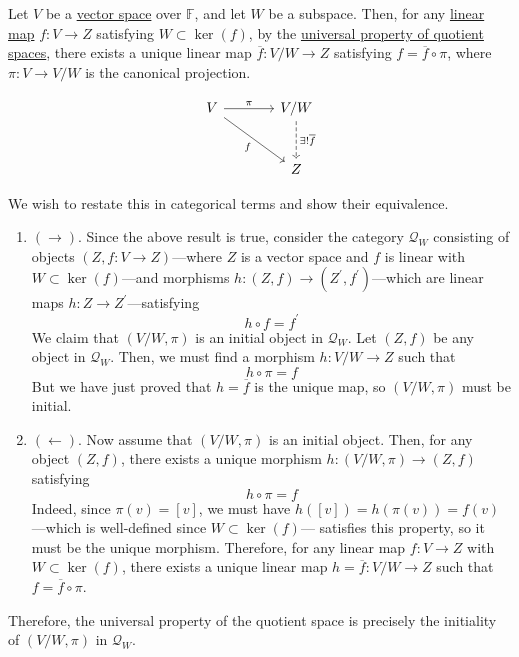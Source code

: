   \begin{example}
    \label{ex:quotient-vector-spaces-as-initial-universal}
		Let $V$ be a \hyperref[lin-def:vector-space]{vector space} over $\mathbb{F}$, and let $W$ be a subspace. Then, for any \hyperref[lin-def:linear_map]{linear map} $f: V \to Z$ satisfying $W \subset \ker(f)$, by the \hyperref[lin-thm:universal_quotient]{universal property of quotient spaces}, there exists a unique linear map $\overline{f}: V/W \to Z$ satisfying $f = \overline{f} \circ \pi$, where $\pi: V \to V/W$ is the canonical projection. 

    \begin{equation}
      \begin{tikzcd}[column sep=large, row sep=large]
        V \arrow[r, "\pi"] \arrow[dr, "f"'] &
        V/W \arrow[d, dashed, "\exists!\overline f"] \\
        & Z
      \end{tikzcd}
    \end{equation}

		We wish to restate this in categorical terms and show their equivalence. 
		\begin{enumerate}
			\item $(\rightarrow)$. Since the above result is true, consider the category $\mathcal{Q}_W$ consisting of objects $(Z, f: V \to Z)$---where $Z$ is a vector space and $f$ is linear with $W \subset \ker(f)$---and morphisms $h: (Z, f) \to (Z^\prime, f^\prime)$---which are linear maps $h: Z \to Z^\prime$---satisfying 
				\begin{equation}
				  h \circ f = f^\prime
				\end{equation}
				We claim that $(V/W, \pi)$ is an initial object in $\mathcal{Q}_W$. Let $(Z, f)$ be any object in $\mathcal{Q}_W$. Then, we must find a morphism $h: V/W \to Z$ such that 
				\begin{equation}
				  h \circ \pi = f 
				\end{equation}
				But we have just proved that $h = \overline{f}$ is the unique map, so $(V/W, \pi)$ must be initial. 

			\item $(\leftarrow)$. Now assume that $(V/W, \pi)$ is an initial object. Then, for any object $(Z, f)$, there exists a unique morphism $h: (V/W, \pi) \to (Z, f)$ satisfying 
				\begin{equation}
				  h \circ \pi = f
				\end{equation}
				Indeed, since $\pi(v) = [v]$, we must have $h([v]) = h(\pi(v)) = f(v)$---which is well-defined since $W \subset \ker(f)$--- satisfies this property, so it must be the unique morphism. Therefore, for any linear map $f: V \to Z$ with $W \subset \ker(f)$, there exists a unique linear map $h = \overline{f}: V/W \to Z$ such that $f = \overline{f} \circ \pi$. 
		\end{enumerate}
    Therefore, the universal property of the quotient space is precisely the initiality of $(V/W,\pi)$ in $\mathcal Q_W$.
  \end{example}

